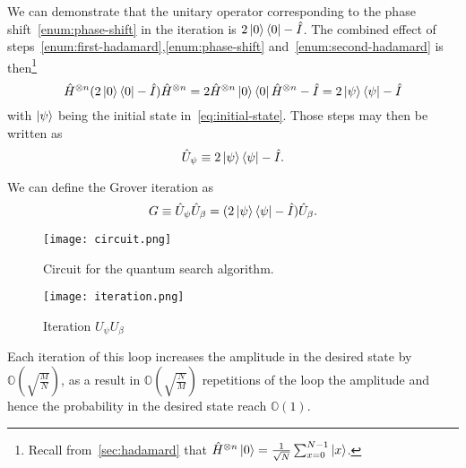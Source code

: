 \begin{defn}
We can demonstrate that the unitary operator corresponding to the phase shift~\ref{enum:phase-shift} in the iteration is $2\ket{0}\bra{0}-\hat{I}$. The combined effect of steps~\ref{enum:first-hadamard},\ref{enum:phase-shift} and~\ref{enum:second-hadamard} is then\footnote{Recall from~\ref{sec:hadamard} that $\hat{H}^{\otimes n} \ket{0} = \frac{1}{\sqrt{N}} \sum_{x=0}^{N-1}\ket{x}$.}
\begin{equation*}
    \hat{H}^{\otimes n} (2\ket{0}\bra{0}-\hat{I}) \hat{H}^{\otimes n} =   2\hat{H}^{\otimes n} \ket{0}\bra{0} \hat{H}^{\otimes n} -\hat{I} = 2\ket{\psi}\bra{\psi}-\hat{I}
\end{equation*}
with $\ket{\psi}$ being the initial state in~\ref{eq:initial-state}. Those steps may then be written as
\begin{equation}\label{eq:psi-reflection}
    \hat{U}_\psi \equiv 2 \ket{\psi}\bra{\psi} - \hat{I}.
\end{equation}
\end{defn}
\begin{defn}
We can define the Grover iteration as
\begin{equation}\label{eq:grover-iteration}
G \equiv \hat{U}_\psi\hat{U}_\beta = (2 \ket{\psi}\bra{\psi} - \hat{I}) \hat{U}_\beta.
\end{equation}
\end{defn}
\begin{figure}
\texttt{[image: circuit.png]}
\centering
\caption{Circuit for the quantum search algorithm.}
\end{figure}
\begin{figure}
\texttt{[image: iteration.png]}
\centering
\caption{Iteration $U_\psi U_\beta$}
\end{figure}
Each iteration of this loop increases the amplitude in the desired state by $\mathbb{O}(\sqrt{\frac{M}{N}})$, as a result in $\mathbb{O}(\sqrt{\frac{N}{M}})$ repetitions of the loop the amplitude and hence the probability in the desired state reach $\mathbb{O}(1)$.

